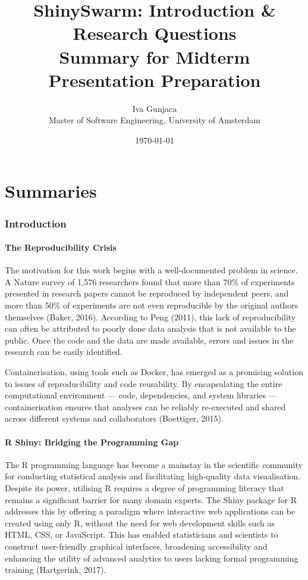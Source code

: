 \documentclass[12pt,a4paper]{article}
\title{\textbf{ShinySwarm: Introduction \& Research Questions}\\[0.5em]
\large Summary for Midterm Presentation Preparation}
\author{Iva Gunjaca\\
Master of Software Engineering, University of Amsterdam}
\date{\today}
\begin{document}
\maketitle
\tableofcontents
\newpage


\part{Summaries}

\section{Introduction}

\subsection{The Reproducibility Crisis}

The motivation for this work begins with a well-documented problem in science. A Nature survey of 1,576 researchers found that more than 70\% of experiments presented in research papers cannot be reproduced by independent peers, and more than 50\% of experiments are not even reproducible by the original authors themselves (Baker, 2016). According to Peng (2011), this lack of reproducibility can often be attributed to poorly done data analysis that is not available to the public. Once the code and the data are made available, errors and issues in the research can be easily identified.

Containerisation, using tools such as Docker, has emerged as a promising solution to issues of reproducibility and code reusability. By encapsulating the entire computational environment --- code, dependencies, and system libraries --- containerisation ensures that analyses can be reliably re-executed and shared across different systems and collaborators (Boettiger, 2015).

\subsection{R Shiny: Bridging the Programming Gap}

The R programming language has become a mainstay in the scientific community for conducting statistical analysis and facilitating high-quality data visualisation. Despite its power, utilising R requires a degree of programming literacy that remains a significant barrier for many domain experts. The Shiny package for R addresses this by offering a paradigm where interactive web applications can be created using only R, without the need for web development skills such as HTML, CSS, or JavaScript. This has enabled statisticians and scientists to construct user-friendly graphical interfaces, broadening accessibility and enhancing the utility of advanced analytics to users lacking formal programming training (Hartgerink, 2017).
\end{document}
